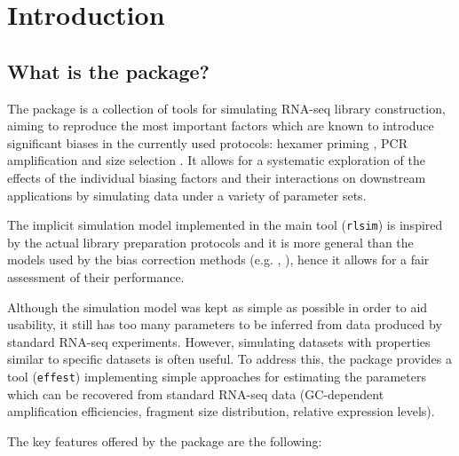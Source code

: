 \section{Introduction}
\label{s:intro}

\subsection{What is the \rlsim package?}
\label{ss:abstract}

The \rlsim package is a collection of tools for simulating RNA-seq library construction, aiming to reproduce the most important factors which are known to introduce significant biases in the currently used protocols: hexamer priming \cite{hansen10}, PCR amplification \cite{dohm08,benjamini12} and size selection \cite{lee11}. It allows for a systematic exploration of the effects of the individual biasing factors and their interactions on downstream applications by simulating data under a variety of parameter sets. 

The implicit simulation model implemented in the main tool ({\tt rlsim}) is inspired by the actual library preparation protocols and it is more general than the models used by the bias correction methods (e.g. \cite{li10}, \cite{jones12}), hence it allows for a fair assessment of their performance.

Although the simulation model was kept as simple as possible in order to aid usability, it still has too many parameters to be inferred from data produced by standard RNA-seq experiments. However, simulating datasets with properties similar to specific datasets is often useful. To address this, the package provides a tool ({\tt effest}) implementing simple approaches for estimating the parameters which can be recovered from standard RNA-seq data (GC-dependent amplification efficiencies, fragment size distribution, relative expression levels).

The key features offered by the package are the following:

